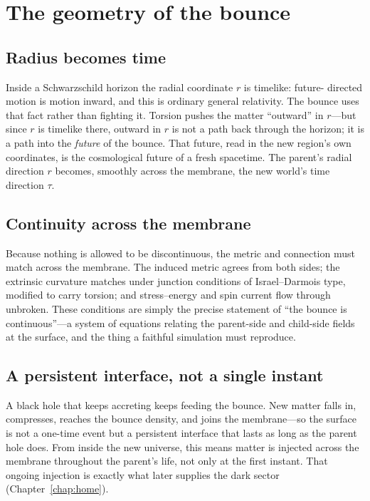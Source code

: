 \section{The geometry of the bounce}

\subsection{Radius becomes time}

Inside a Schwarzschild horizon the radial coordinate $r$ is timelike: future-%
directed motion is motion inward, and this is ordinary general relativity. The
bounce uses that fact rather than fighting it. Torsion pushes the matter
``outward'' in $r$---but since $r$ is timelike there, outward in $r$ is not a
path back through the horizon; it is a path into the \emph{future} of the bounce.
That future, read in the new region's own coordinates, is the cosmological future
of a fresh spacetime. The parent's radial direction $r$ becomes, smoothly across
the membrane, the new world's time direction $\tau$.

\subsection{Continuity across the membrane}

Because nothing is allowed to be discontinuous, the metric and connection must
match across the membrane. The induced metric agrees from both sides; the
extrinsic curvature matches under junction conditions of Israel--Darmois type,
modified to carry torsion; and stress--energy and spin current flow through
unbroken. These conditions are simply the precise statement of ``the bounce is
continuous''---a system of equations relating the parent-side and child-side
fields at the surface, and the thing a faithful simulation must reproduce.

\subsection{A persistent interface, not a single instant}

A black hole that keeps accreting keeps feeding the bounce. New matter falls in,
compresses, reaches the bounce density, and joins the membrane---so the surface
is not a one-time event but a persistent interface that lasts as long as the
parent hole does. From inside the new universe, this means matter is injected
across the membrane throughout the parent's life, not only at the first instant.
That ongoing injection is exactly what later supplies the dark sector
(Chapter~\ref{chap:home}).

